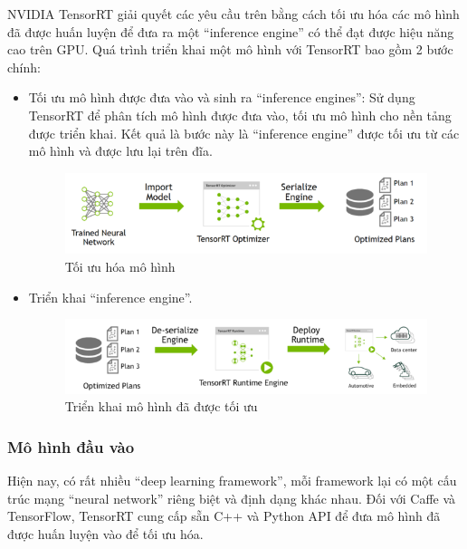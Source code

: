 \documentclass[a4paper]{report}
\begin{document}
NVIDIA TensorRT giải quyết các yêu cầu trên bằng cách tối ưu hóa các mô hình đã được huấn luyện để đưa ra một “inference engine” có thể đạt được hiệu năng cao trên GPU. Quá trình triển khai một mô hình với TensorRT bao gồm 2 bước chính:
\begin{itemize}
	\item Tối ưu mô hình được đưa vào và sinh ra “inference engines”: Sử dụng TensorRT để phân tích mô hình được đưa vào, tối ưu mô hình cho nền tảng được triển khai. Kết quả là bước này là “inference engine” được tối ưu từ các mô hình và được lưu lại trên đĩa.
	\begin{figure}[h!]
		\centering
		\includegraphics[width=1\textwidth]{4_2_infermodel.png}
		\caption{Tối ưu hóa mô hình}
	\end{figure}

	\item Triển khai “inference engine”.
	\begin{figure}[h!]
		\centering
		\includegraphics[width=1\textwidth]{4_2_infermodel2.png}
		\caption{Triển khai mô hình đã được tối ưu}
	\end{figure}
\end{itemize}
\subsubsection{Mô hình đầu vào}
Hiện nay, có rất nhiều “deep learning framework”, mỗi framework lại có một cấu trúc mạng “neural network” riêng biệt và định dạng khác nhau. Đối với Caffe và TensorFlow, TensorRT cung cấp sẵn C++ và Python API để đưa mô hình đã được huấn luyện vào để tối ưu hóa.\\
\end{document}
